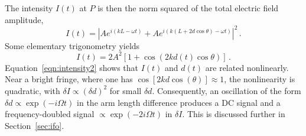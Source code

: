 \documentclass[paper-main.tex]{subfiles}
\begin{document}
The intensity $I(t)$ at $P$ is then the norm squared of the total electric field amplitude,
\begin{equation}
I(t) = \left| A e^{i (k L - \omega t)}  + A e^{i (k (L + 2 d \cos{\theta}) - \omega t)} \right|^2\,.
\label{eqn:intensity1}    
\end{equation}
Some elementary trigonometry yields
\begin{equation}
I(t) = 2 A^2 \left[ 1 + \cos{\left( 2 k d(t) \cos{\theta} \right) } \right]  \label{eqn:intensity2}\,.
\end{equation}
Equation~\ref{eqn:intensity2} shows that $I(t)$ and $d(t)$ are related nonlinearly. 
Near a bright fringe, where one has $\cos{[2kd\cos{(\theta)}]} \approx 1$, the nonlinearity is quadratic, with $\delta I \propto (\delta d)^2$ for small $\delta d$. 
Consequently, an oscillation of the form $\delta d \propto \exp{( -i \Omega t )}$ in the arm length difference produces a DC signal and a frequency-doubled signal $\propto \exp{(-2i\Omega t)}$ in $\delta I$. 
This is discussed further in Section~\ref{sec:ifo}.






\end{document}
